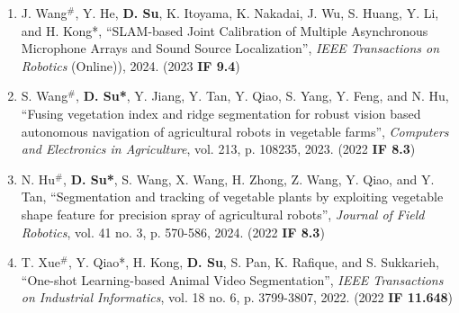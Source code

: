 \documentclass[margin,line]{res}
\begin{document}
\begin{resume}
\begin{enumerate}

\item J. Wang$^{\#}$, Y. He, \textbf{D. Su}, K. Itoyama, K. Nakadai, J. Wu, S. Huang, Y. Li, and H. Kong*, ``SLAM-based Joint Calibration of Multiple Asynchronous Microphone Arrays and Sound Source Localization'', {\it IEEE Transactions on Robotics} (Online)), 2024. (2023 \textbf{IF 9.4})

\item S. Wang$^{\#}$, \textbf{D. Su*}, Y. Jiang, Y. Tan, Y. Qiao, S. Yang, Y. Feng, and N. Hu, ``Fusing vegetation index and ridge segmentation for robust vision based autonomous navigation of agricultural robots in vegetable farms'', {\it Computers and Electronics in Agriculture}, vol. 213, p. 108235, 2023. (2022 \textbf{IF 8.3})

\item N. Hu$^{\#}$,  \textbf{D. Su*}, S. Wang, X. Wang, H. Zhong, Z. Wang, Y. Qiao, and Y. Tan, ``Segmentation and tracking of vegetable plants by exploiting vegetable shape feature for precision spray of agricultural robots'', {\it Journal of Field Robotics}, vol. 41 no. 3, p. 570-586, 2024. (2022 \textbf{IF 8.3})

\item T. Xue$^{\#}$, Y. Qiao*, H. Kong, \textbf{D. Su}, S. Pan, K. Rafique, and S. Sukkarieh, ``One-shot Learning-based Animal Video Segmentation'', {\it IEEE Transactions on Industrial Informatics}, vol. 18 no. 6, p. 3799-3807, 2022. (2022 \textbf{IF 11.648})


\end{enumerate}
\end{resume}
\end{document}
